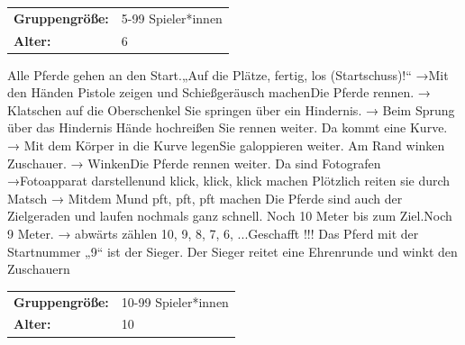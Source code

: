 \newpage
\begin{table}[H]
\begin{tabular}{>{\bfseries}lp{8cm}}
   Gruppengröße:   & 5-99 Spieler*innen\\
    Alter: & 6 \\
\end{tabular}
\end{table} 
Alle Pferde gehen an den Start.„Auf die Plätze, fertig, los (Startschuss)!“ →Mit den Händen Pistole zeigen \newline
und Schießgeräusch machenDie Pferde rennen. → Klatschen auf die Oberschenkel \newline
Sie springen über ein Hindernis. → Beim Sprung über
das Hindernis Hände hochreißen Sie rennen weiter.\newline 
Da kommt eine Kurve. → Mit dem Körper in die Kurve legenSie galoppieren weiter. \newline
Am Rand winken Zuschauer. → WinkenDie Pferde rennen weiter.\newline
Da sind Fotografen  →Fotoapparat darstellenund klick, klick, klick machen\newline
Plötzlich reiten sie durch Matsch → Mitdem Mund pft, pft, pft machen\newline
Die Pferde sind auch der Zielgeraden und laufen nochmals ganz schnell. \newline
Noch 10 Meter bis zum Ziel.Noch 9 Meter. → abwärts zählen 10, 9, 8, 7, 6, ...Geschafft !!! \newline
Das Pferd mit der Startnummer „9“ ist der Sieger.\newline
Der Sieger reitet eine Ehrenrunde und winkt den Zuschauern\\



\begin{table}[H]
\begin{tabular}{>{\bfseries}lp{8cm}}
   Gruppengröße:   & 10-99 Spieler*innen\\
    Alter: & 10 \\
\end{tabular}
\end{table} 

